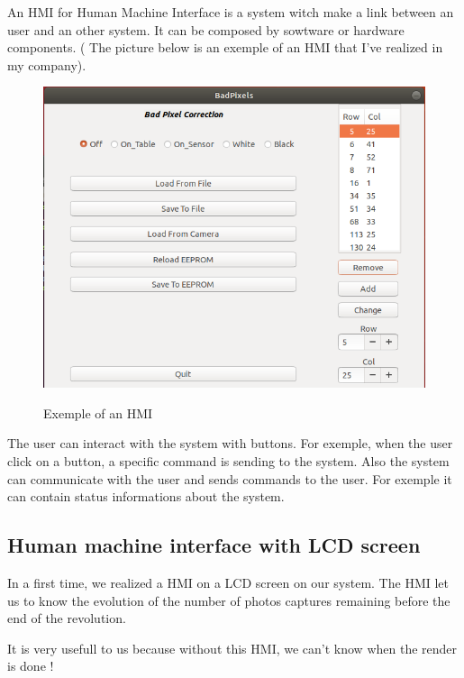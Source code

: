 An HMI for Human Machine Interface is a system witch make a link between an user and an other system. It can be composed by  sowtware or hardware components. ( The picture below is an exemple of an HMI that I've realized in my company). 

\begin{figure}[h]
    \centering
    \includegraphics[scale=0.35]{img/IHM.png}\\%
    \caption{Exemple of an HMI}
    \label{fig:LogoTachyssema}
  \end{figure}

  The user can interact with the system with buttons. For exemple, when the user click on a button, a specific command is sending to the system. Also the system can communicate with the user and sends commands to the user. For exemple it can contain status informations about the system. 

\subsection {Human machine interface with LCD screen } 

In a first time, we realized a HMI on a LCD screen on our system. The HMI let us to know the evolution of the number of photos captures remaining before the end of the revolution.

It is very usefull to us because without this HMI, we can't know when the render is done ! 
\newpage

